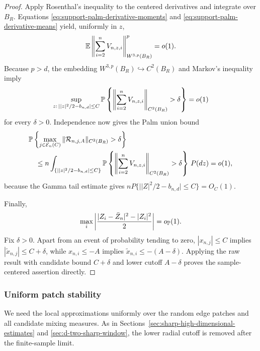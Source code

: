 \begin{proof}
Apply Rosenthal's inequality to the centered derivatives and integrate over
\(B_R\).  Equations \eqref{eq:support-palm-derivative-moments} and
\eqref{eq:support-palm-derivative-means} yield, uniformly in \(z\),
\[
 \mathbb E\left\|
   \sum_{i=2}^nV_{n,z,i}
 \right\|_{W^{3,p}(B_R)}^p=o(1).
\]
Because \(p>d\), the embedding \(W^{3,p}(B_R)\hookrightarrow C^2(B_R)\)
and Markov's inequality imply
\[
 \sup_{z:\,\lvert |z|^2/2-b_{n,d}\rvert\le C}
 \mathbb P\left\{
  \left\|\sum_{i=2}^nV_{n,z,i}\right\|_{C^2(B_R)}>\delta
 \right\}=o(1)
\]
for every \(\delta>0\).  Independence now gives the Palm union bound
\begin{align*}
 &\mathbb P\left\{
   \max_{j\in\mathcal E_n(C)}
   \|\mathcal R_{n,j,A}\|_{C^2(B_R)}>\delta
 \right\}\\
 &\quad\le n\int_{\{\lvert |z|^2/2-b_{n,d}\rvert\le C\}}
  \mathbb P\left\{
   \left\|\sum_{i=2}^nV_{n,z,i}\right\|_{C^2(B_R)}>\delta
  \right\}\,P(dz)=o(1),
\end{align*}
because the Gamma tail estimate gives
\(nP\{\lvert |Z|^2/2-b_{n,d}\rvert\le C\}=O_C(1)\).

Finally,
\[
 \max_i\left|
  \frac{|Z_i-\bar Z_n|^2-|Z_i|^2}{2}
 \right|=o_{\mathbb P}(1).
\]
Fix \(\delta>0\).  Apart from an event of probability tending to zero,
\(|x_{n,j}|\le C\) implies \(|\widetilde x_{n,j}|\le C+\delta\), while
\(x_{n,i}\le-A\) implies
\(\widetilde x_{n,i}\le-(A-\delta)\).  Applying the raw result with
candidate bound \(C+\delta\) and lower cutoff \(A-\delta\) proves the
sample-centered assertion directly.
\end{proof}

\subsubsection{Uniform patch stability}

We need the local approximations uniformly over the random edge patches and
all candidate mixing measures. As in
Sections~\ref{sec:sharp-high-dimensional-estimates} and
\ref{sec:d-two-sharp-window}, the lower radial cutoff is removed after the
finite-sample limit.

